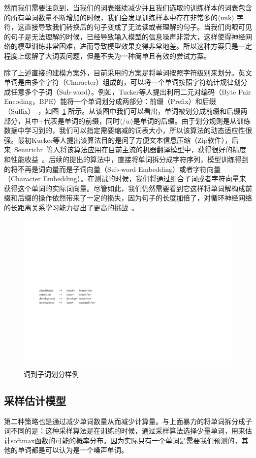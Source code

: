 然而我们需要注意到，当我们的词表继续减少并且我们选取的训练样本的词表包含的所有单词数量不断增加的时候，我们会发现训练样本中存在非常多的$\langle$unk$\rangle$ 字符，这直接导致我们转换后的句子变成了无法读或者理解的句子。当我们肉眼可见的句子是无法理解的时候，已经导致输入模型的信息噪声非常大，这样使得神经网络的模型训练非常困难，进而导致模型效果变得非常地差。所以这种方案只是一定程度上缓解了大词表问题，但是不失为一种简单且有效的尝试方案。

除了上述直接的建模方案外，目前采用的方案是将单词按照字符级别来划分。英文单词是由多个字符（Character）组成的，可以将一个单词按照字符统计规律划分成任意多个子词（Sub-word）。例如，Tucker等人提出利用二元对编码（Byte Pair Encoding，BPE）能将一个单词划分成两部分：前缀（Prefix）和后缀（Suffix）~，如图~\ref{fig:subword} 所示。从该图中我们可以看出，单词被划分成前缀和后缀两部分，其中$+$代表是单词的前缀，同时$\langle /w \rangle$是单词的后缀。由于划分规则是从训练数据中学习到的，我们可以指定需要缩减的词表大小，所以该算法的动态适应性很强。最初Kucker等人提出该算法目的是问了方便文本信息压缩（Zip软件），后来~Sennrichr~等人将该算法应用在目前主流的机器翻译模型中，获得很好的精度和性能收益~。后续的提出的算法中，直接将单词拆分成字符序列，模型训练得到的将不再是词向量而是子词向量（Sub-word Embedding）或者字符向量（Character Embedding）。在测试的时候，我们将通过组合子词或者字符向量来获得这个单词的实际词向量。尽管如此，我们仍然需要看到它这样将单词解构成前缀和后缀的操作依然带来了一定的损失，因为句子的长度加倍了，对循环神经网络的长距离关系学习能力提出了更高的挑战~。

\begin{figure}[!h]
  \centering
\includegraphics[width=0.56\linewidth]{./figures/subword.pdf}
\caption{词到子词划分样例}\label{fig:subword}
\end{figure}

\subsection{采样估计模型}
第二种策略也是通过减少单词数量从而减少计算量。与上面暴力的将单词拆分成子词不同的是：这种采样算法是在训练的时候，通过采样算法选择少量单词，用来估计softmax函数的可能的概率分布。因为实际只有一个单词是需要我们预测的，其他的单词都是可以认为是一个噪声单词。

